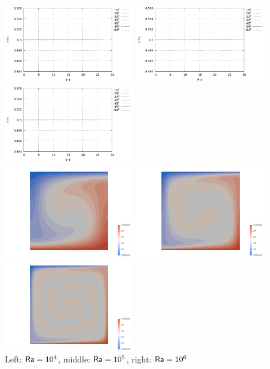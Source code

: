\begin{center}
\includegraphics[width=5.7cm]{python_codes/fieldstone_110/results_BA/T_avrg_Ra1e4.pdf}
\includegraphics[width=5.7cm]{python_codes/fieldstone_110/results_BA/T_avrg_Ra1e5.pdf}
\includegraphics[width=5.7cm]{python_codes/fieldstone_110/results_BA/T_avrg_Ra1e6.pdf}\\
\includegraphics[width=5.7cm]{python_codes/fieldstone_110/results_BA/T_Ra1e4.png}
\includegraphics[width=5.7cm]{python_codes/fieldstone_110/results_BA/T_Ra1e5.png}
\includegraphics[width=5.7cm]{python_codes/fieldstone_110/results_BA/T_Ra1e6.png}\\
{\captionfont Left: ${\mathsf{Ra}}=10^4$, middle: ${\mathsf{Ra}}=10^5$, right: ${\mathsf{Ra}}=10^6$} 
\end{center}

